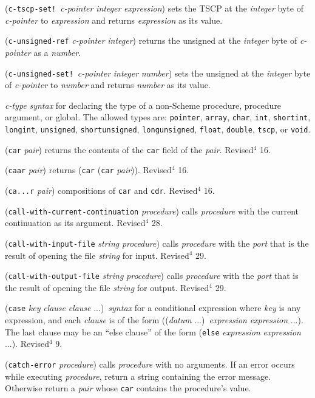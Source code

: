 \documentclass[10pt,twocolumn]{article}
\begin{document}
(\texttt{c-tscp-set!}\ \emph{c-pointer} \emph{integer} \emph{expression}) sets the
TSCP at the \emph{integer} byte of \emph{c-pointer}
to \emph{expression} and returns \emph{expression} as its value.

(\texttt{c-unsigned-ref} \emph{c-pointer} \emph{integer}) returns the unsigned
at the \emph{integer} byte of \emph{c-pointer} as a \emph{number}.

(\texttt{c-unsigned-set!}\ \emph{c-pointer} \emph{integer} \emph{number}) sets the
unsigned at the \emph{integer} byte of \emph{c-pointer} to \emph{number} and
returns \emph{number} as its value.

\emph{c-type} \emph{syntax} for declaring the type of a non-Scheme
procedure, procedure argument, or global.  The allowed types are:
\texttt{pointer}, \texttt{array}, \texttt{char}, \texttt{int}, \texttt{shortint}, \texttt{longint},
\texttt{unsigned}, \texttt{shortunsigned}, \texttt{longunsigned}, \texttt{float},
\texttt{double}, \texttt{tscp}, or \texttt{void}.

(\texttt{car} \emph{pair}) returns the contents of the \texttt{car} field of the
\emph{pair}.  Revised$^4$ 16.

(\texttt{caar} \emph{pair}) returns (\texttt{car} (\texttt{car} \emph{pair})).
Revised$^4$ 16.

(\texttt{ca...r} \emph{pair}) compositions of \texttt{car} and \texttt{cdr}.
Revised$^4$ 16.

(\texttt{call-with-current-continuation} \emph{procedure}) calls \emph{procedure}
with the current continuation as its argument.  Revised$^4$ 28.

(\texttt{call-with-input-file} \emph{string} \emph{procedure}) calls \emph{procedure}
with the \emph{port} that is the result of opening the file \emph{string}
for input.  Revised$^4$ 29.

(\texttt{call-with-output-file} \emph{string} \emph{procedure}) calls \emph{procedure}
with the \emph{port} that is the result of opening the file \emph{string}
for output.  Revised$^4$ 29.

(\texttt{case} \emph{key} \emph{clause} \emph{clause} ...)\ \emph{syntax} for a
conditional expression where \emph{key} is any expression, and each
\emph{clause} is of the form ((\emph{datum} ...)\ \emph{expression}
\emph{expression} ...).  The last clause may be an ``else clause'' of the
form (\texttt{else}  \emph{expression} \emph{expression} ...).  Revised$^4$ 9.

(\texttt{catch-error} \emph{procedure}) calls \emph{procedure} with no
arguments.  If an error occurs while executing \emph{procedure}, return
a string containing the error message.  Otherwise return a \emph{pair} whose
\texttt{car} contains the procedure's value.
\end{document}
